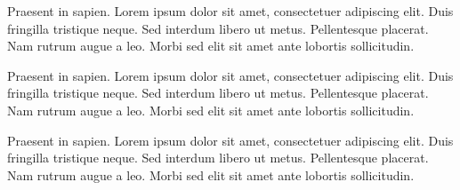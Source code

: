 Praesent in sapien. Lorem ipsum dolor sit amet, consectetuer adipiscing elit.
Duis fringilla tristique neque. Sed interdum libero ut metus. Pellentesque placerat.
Nam rutrum augue a leo. Morbi sed elit sit amet ante lobortis sollicitudin.

\clearpage %




Praesent in sapien. Lorem ipsum dolor sit amet, consectetuer adipiscing elit.
Duis fringilla tristique neque. Sed interdum libero ut metus. Pellentesque placerat.
Nam rutrum augue a leo. Morbi sed elit sit amet ante lobortis sollicitudin.




Praesent in sapien. Lorem ipsum dolor sit amet, consectetuer adipiscing elit.
Duis fringilla tristique neque. Sed interdum libero ut metus. Pellentesque placerat.
Nam rutrum augue a leo. Morbi sed elit sit amet ante lobortis sollicitudin.

